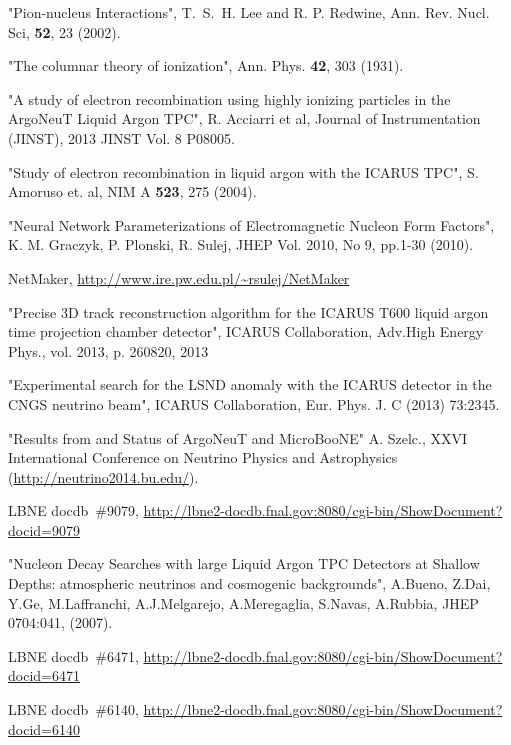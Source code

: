 \begin{thebibliography}{99}
 "Pion-nucleus Interactions", T.~S.~H. Lee and R. P. Redwine, Ann. Rev. Nucl. Sci,  {\bf 52}, 23 (2002).

 "The columnar theory of ionization", Ann. Phys. {\bf 42}, 303 (1931).

 "A study of electron recombination using highly ionizing particles in the ArgoNeuT Liquid Argon TPC", 
R. Acciarri et al, Journal of Instrumentation 
(JINST), 2013 JINST Vol. 8 P08005.

 "Study of electron recombination in liquid argon with the ICARUS TPC", S. Amoruso et. al, NIM A {\bf 523}, 275 (2004). 

 "Neural Network Parameterizations of Electromagnetic Nucleon Form Factors", K. M. Graczyk, P. Plonski, R. Sulej, JHEP Vol. 2010, No 9, pp.1-30 (2010).

 NetMaker, \url{http://www.ire.pw.edu.pl/~rsulej/NetMaker}

"Precise 3D track reconstruction algorithm for the ICARUS T600 liquid argon time projection chamber detector", ICARUS Collaboration, 
Adv.High Energy Phys., vol. 2013, p. 260820, 2013

 "Experimental search for the LSND anomaly with the ICARUS
detector in the CNGS neutrino beam", ICARUS Collaboration, Eur. Phys. J. C (2013) 73:2345.

 "Results from and Status of ArgoNeuT and MicroBooNE" A. Szelc., XXVI International Conference on Neutrino Physics and Astrophysics (\url{http://neutrino2014.bu.edu/}).

 LBNE docdb~\#9079, \url{http://lbne2-docdb.fnal.gov:8080/cgi-bin/ShowDocument?docid=9079}

 "Nucleon Decay Searches with large Liquid Argon TPC Detectors at Shallow Depths: atmospheric neutrinos and cosmogenic backgrounds", A.Bueno, Z.Dai, Y.Ge, M.Laffranchi, A.J.Melgarejo, A.Meregaglia, S.Navas, A.Rubbia, JHEP 0704:041, (2007).

%
%
 LBNE docdb~\#6471, \url{http://lbne2-docdb.fnal.gov:8080/cgi-bin/ShowDocument?docid=6471}

 LBNE docdb~\#6140, \url{http://lbne2-docdb.fnal.gov:8080/cgi-bin/ShowDocument?docid=6140}


\end{thebibliography}
